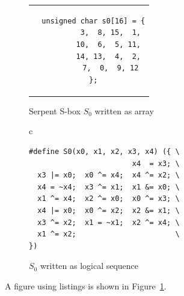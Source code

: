 \documentclass[10pt,twoside,a4paper,bibliography=totoc]{scrbook}
\begin{document}
\begin{figure}
\centering
\begin{minipage}[b]{0.45\textwidth}
\centering
\begin{tabular}{c}
\begin{lstlisting}
  unsigned char s0[16] = {
          3,  8, 15,  1,
         10,  6,  5, 11,
         14, 13,  4,  2,
          7,  0,  9, 12
  };
\end{lstlisting}
\end{tabular}
\caption{Serpent S-box $S_0$ written as array}
\label{fig:serpents0a}
\end{minipage}
\hspace{0.25cm}
\vline
\hspace{0.25cm}
\begin{minipage}[b]{0.45\textwidth}
\centering
\begin{tabular}{c}
\begin{lstlisting}
#define S0(x0, x1, x2, x3, x4) ({ \
                        x4  = x3; \
  x3 |= x0;  x0 ^= x4;  x4 ^= x2; \
  x4 = ~x4;  x3 ^= x1;  x1 &= x0; \
  x1 ^= x4;  x2 ^= x0;  x0 ^= x3; \
  x4 |= x0;  x0 ^= x2;  x2 &= x1; \
  x3 ^= x2;  x1 = ~x1;  x2 ^= x4; \
  x1 ^= x2;                       \
})
\end{lstlisting}
\end{tabular}
\caption{$S_0$ written as logical sequence}
\label{fig:serpents0l}
\end{minipage}
\end{figure}


A figure using listings is shown in Figure~\ref{fig:serpents0l}. \blindtext
\end{document}
